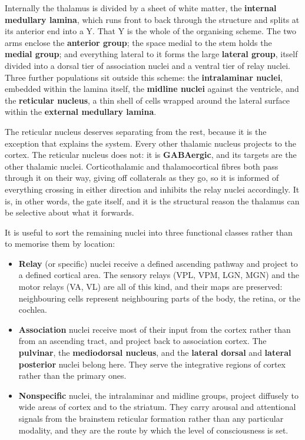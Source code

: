 \documentclass[11pt]{article}
\begin{document}
Internally the thalamus is divided by a sheet of white matter, the \textbf{internal medullary lamina}, which runs front to back through the structure and splits at its anterior end into a Y. That Y is the whole of the organising scheme. The two arms enclose the \textbf{anterior group}; the space medial to the stem holds the \textbf{medial group}; and everything lateral to it forms the large \textbf{lateral group}, itself divided into a dorsal tier of association nuclei and a ventral tier of relay nuclei. Three further populations sit outside this scheme: the \textbf{intralaminar nuclei}, embedded within the lamina itself, the \textbf{midline nuclei} against the ventricle, and the \textbf{reticular nucleus}, a thin shell of cells wrapped around the lateral surface within the \textbf{external medullary lamina}.

The reticular nucleus deserves separating from the rest, because it is the exception that explains the system. Every other thalamic nucleus projects to the cortex. The reticular nucleus does not: it is \textbf{GABAergic}, and its targets are the other thalamic nuclei. Corticothalamic and thalamocortical fibres both pass through it on their way, giving off collaterals as they go, so it is informed of everything crossing in either direction and inhibits the relay nuclei accordingly. It is, in other words, the gate itself, and it is the structural reason the thalamus can be selective about what it forwards.

It is useful to sort the remaining nuclei into three functional classes rather than to memorise them by location:

\begin{itemize}
    \item \textbf{Relay} (or specific) nuclei receive a defined ascending pathway and project to a defined cortical area. The sensory relays (VPL, VPM, LGN, MGN) and the motor relays (VA, VL) are all of this kind, and their maps are preserved: neighbouring cells represent neighbouring parts of the body, the retina, or the cochlea.
    \item \textbf{Association} nuclei receive most of their input from the cortex rather than from an ascending tract, and project back to association cortex. The \textbf{pulvinar}, the \textbf{mediodorsal nucleus}, and the \textbf{lateral dorsal} and \textbf{lateral posterior} nuclei belong here. They serve the integrative regions of cortex rather than the primary ones.
    \item \textbf{Nonspecific} nuclei, the intralaminar and midline groups, project diffusely to wide areas of cortex and to the striatum. They carry arousal and attentional signals from the brainstem reticular formation rather than any particular modality, and they are the route by which the level of consciousness is set.
\end{itemize}
\end{document}
